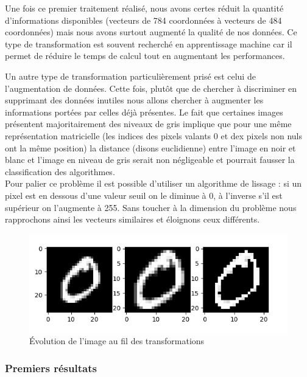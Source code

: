 \documentclass{article}
\begin{document}
Une fois ce premier traitement réalisé, nous avons certes réduit la quantité d'informations disponibles (vecteurs de 784 coordonnées à vecteurs de 484 coordonnées) mais nous avons surtout augmenté la qualité de nos données. Ce type de transformation est souvent recherché en apprentissage machine car il permet de réduire le temps de calcul tout en augmentant les performances. 

Un autre type de transformation particulièrement prisé est celui de l'augmentation de données. \newline
Cette fois, plutôt que de chercher à discriminer en supprimant des données inutiles nous allons chercher à augmenter les informations portées par celles déjà présentes. Le fait que certaines images présentent majoritairement des niveaux de gris implique que pour une même représentation matricielle (les indices des pixels valants 0 et dex pixels non nuls ont la même position) la distance (disons euclidienne) entre l'image en noir et blanc et l'image en niveau de gris serait non négligeable et pourrait fausser la classification des algorithmes. \\

Pour palier ce problème il est possible d'utiliser un algorithme de lissage : si un pixel est en dessous d'une valeur seuil on le diminue à 0, à l'inverse s'il est supérieur on l'augmente à 255. Sans toucher à la dimension du problème nous rapprochons ainsi les vecteurs similaires et éloignons ceux différents.


\begin{figure}[H]
    \centering
    \includegraphics[width=\textwidth]{"./Images/pre_pro_0.png"}
    \caption{\label{fig:lign1}Évolution de l'image au fil des transformations}
\end{figure}

\subsubsection{Premiers résultats}
\end{document}
